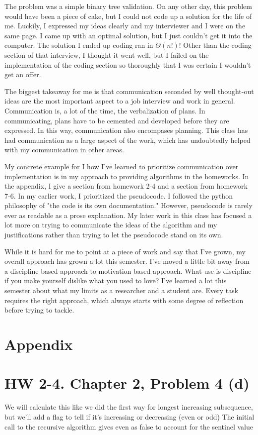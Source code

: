 \documentclass{article}
\begin{document}
The problem was a simple binary tree validation. On any other day, this problem would have been a piece of cake, but I could not code up a solution for the life of me. Luckily, I expressed my ideas clearly and my interviewer and I were on the same page. I came up with an optimal solution, but I just couldn't get it into the computer. The solution I ended up coding ran in $\Theta(n!)$! Other than the coding section of that interview, I thought it went well, but I failed on the implementation of the coding section so thoroughly that I was certain I wouldn't get an offer.

The biggest takeaway for me is that communication seconded by well thought-out ideas are the most important aspect to a job interview and work in general. Communication is, a lot of the time, the verbalization of plans. In communicating, plans have to be cemented and developed before they are expressed. In this way, communication also encompases planning. This class has had communication as a large aspect of the work, which has undoubtedly helped with my communication in other areas.

My concrete example for I how I've learned to prioritize communication over implementation is in my approach to providing algorithms in the homeworks. In the appendix, I give a section from homework 2-4 and a section from homework 7-6. In my earlier work, I prioritized the pseudocode. I followed the python philosophy of "the code is its own documentation." However, pseudocode is rarely ever as readable as a prose explanation. My later work in this class has focused a lot more on trying to communicate the ideas of the algorithm and my justifications rather than trying to let the pseudocode stand on its own.

While it is hard for me to point at a piece of work and say that I've grown, my overall approach has grown a lot this semester. I've moved a little bit away from a discipline based approach to motivation based approach. What use is discipline if you make yourself dislike what you used to love? I've learned a lot this semester about what my limits as a researcher and a student are. Every task requires the right approach, which always starts with some degree of reflection before trying to tackle.

\pagebreak
\section*{Appendix}

\section{HW 2-4. Chapter 2, Problem 4 (d)}
We will calculate this like we did the first way for longest increasing subsequence, but we'll add a
flag to tell if it's increasing or decreasing (even or odd)
The initial call to the recursive algorithm gives even as false to account for the sentinel value
\end{document}
